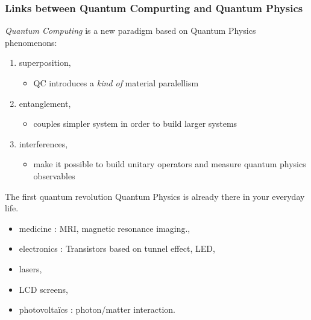 \begin{frame}[plain]
\frametitle{Links between Quantum Compurting and Quantum Physics}
\textit{Quantum Computing} is a new paradigm based on Quantum Physics phenomenons:
\begin{enumerate}
    \item superposition,
        \begin{itemize}
            \item QC introduces a \textit{kind of} material paralellism
        \end{itemize}
    \item entanglement,
         \begin{itemize}
            \item couples simpler system in order to build larger systems
         \end{itemize}
    \item interferences,
        \begin{itemize}
            \item make it possible to build unitary operators and measure quantum physics observables
         \end{itemize}
\end{enumerate}
\end{frame}

\begin{frame}{The first quantum revolution}
    Quantum Physics is already there in your everyday life.  
    \begin{itemize}
        \item medicine : MRI, magnetic resonance imaging.,
        \item electronics : Transistors based on tunnel effect, LED,
        \item lasers,
        \item LCD screens,
        \item  photovoltaïcs : photon/matter interaction.
    \end{itemize}
\end{frame}

